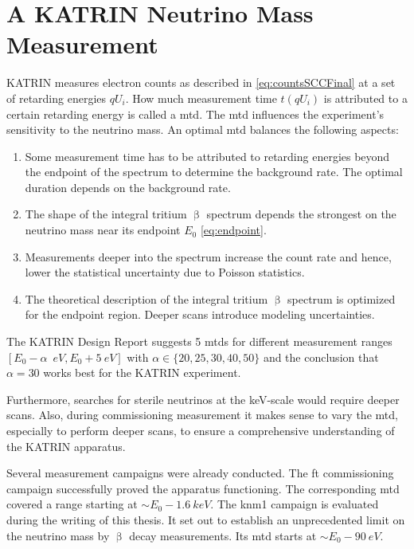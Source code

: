 \def\currentRootFolder{chapter/katrinExperiment/neutrinoMassMeasurement}
\def\currentFigureFolder{\currentRootFolder/fig}



\section{A KATRIN Neutrino Mass Measurement}
\label{sec:katrinExpNuMassMeasurement}
KATRIN measures electron counts as described in \eqref{eq:countsSCCFinal} at a set of retarding energies ${qU_i}$. How much measurement time $t(qU_i)$ is attributed to a certain retarding energy is called a \gls{mtd}. The \gls{mtd} influences the experiment's sensitivity to the neutrino mass. An optimal \gls{mtd} balances the following aspects:
\begin{enumerate}
	\item Some measurement time has to be attributed to retarding energies beyond the endpoint of the spectrum to determine the background rate. The optimal duration depends on the background rate.
	\item The shape of the integral tritium $\upbeta$ spectrum depends the strongest on the neutrino mass near its endpoint $E_0$ \eqref{eq:endpoint}. 
	\item Measurements deeper into the spectrum increase the count rate and hence, lower the statistical uncertainty due to Poisson statistics.
	\item The theoretical description of the integral tritium $\upbeta$ spectrum is optimized for the endpoint region. Deeper scans introduce modeling uncertainties.
\end{enumerate}
The KATRIN Design Report \cite{Angrik:2005ep} suggests 5 \gls{mtd}s for different measurement ranges $[E_0-\alpha\;\SI{}{eV}, E_0 + \SI{5}{eV}]$ with $\alpha \in \{20, 25, 30, 40, 50\}$ and the conclusion that $\alpha=30$ works best for the KATRIN experiment.

Furthermore, searches for sterile neutrinos at the keV-scale would require deeper scans. Also, during commissioning measurement it makes sense to vary the \gls{mtd}, especially to perform deeper scans, to ensure a comprehensive understanding of the KATRIN apparatus.

Several measurement campaigns were already conducted. The \gls{ft} commissioning campaign successfully proved the apparatus functioning. The corresponding \gls{mtd} covered a range starting at $\sim E_0-\SI{1.6}{keV}$. The \gls{knm1} campaign is evaluated during the writing of this thesis. It set out to establish an unprecedented limit on the neutrino mass by $\upbeta$ decay measurements. Its \gls{mtd} starts at $\sim E_0-\SI{90}{eV}$.